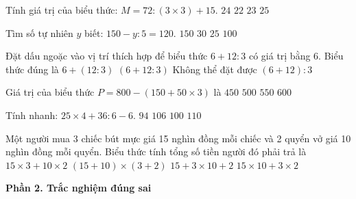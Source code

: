 \begin{ex} %
Tính giá trị của biểu thức: $M = 72 : (3 \times 3) + 15$.
\choice
{$24$}
{$22$}
{\True $23$}
{$25$}
\end{ex}

\begin{ex} %
Tìm số tự nhiên $y$ biết: $150 - y : 5 = 120$.
\choice
{\True $150$}
{$30$}
{$25$}
{$100$}
\end{ex}

\begin{ex} %
Đặt dấu ngoặc vào vị trí thích hợp để biểu thức $6 + 12 : 3$ có giá trị bằng 6. Biểu thức đúng là
\choice
{$6 + (12 : 3)$}
{$(6 + 12 : 3)$}
{Không thể đặt được}
{\True $(6 + 12) : 3$}
\end{ex}

\begin{ex} %
Giá trị của biểu thức $P = 800 - (150 + 50 \times 3)$ là
\choice
{$450$}
{\True $500$}
{$550$}
{$600$}
\end{ex}

\begin{ex} %
Tính nhanh: $25 \times 4 + 36 : 6 - 6$.
\choice
{$94$}
{$106$}
{\True $100$}
{$110$}
\end{ex}

\begin{ex} %
Một người mua 3 chiếc bút mực giá 15 nghìn đồng mỗi chiếc và 2 quyển vở giá 10 nghìn đồng mỗi quyển. Biểu thức tính tổng số tiền người đó phải trả là
\choice
{\True $15 \times 3 + 10 \times 2$}
{$(15 + 10) \times (3 + 2)$}
{$15 + 3 \times 10 + 2$}
{$15 \times 10 + 3 \times 2$}
\end{ex}

\textbf{Phần 2. Trắc nghiệm đúng sai}

